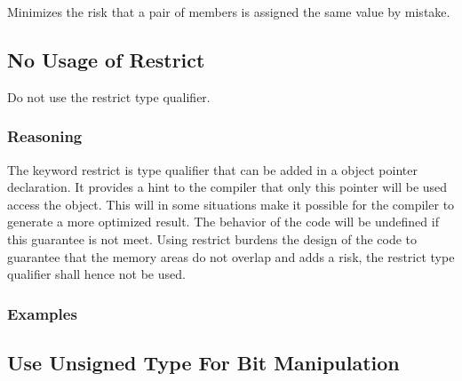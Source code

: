 \documentclass{article}
\begin{document}
Minimizes the risk that a pair of members is assigned the same value by mistake.
\begin{minipage}[t]{0.47\linewidth}

\end{minipage}
\hfill
\begin{minipage}[t]{0.47\linewidth}

\end{minipage}

\subsection{No Usage of Restrict}

Do not use the restrict type qualifier.

\subsubsection{Reasoning}

The keyword restrict is type qualifier that can be added in a object pointer declaration. It provides a hint to the compiler that only this pointer will be used access the object. This will in some situations make it possible for the compiler to generate a more optimized result. The behavior of the code will be undefined if this guarantee is not meet. Using restrict burdens the design of the code to guarantee that the memory areas do not overlap and adds a risk, the restrict type qualifier shall hence not be used.

\subsubsection{Examples}

\begin{minipage}[t]{0.47\linewidth}

\end{minipage}
\hfill
\begin{minipage}[t]{0.47\linewidth}

\end{minipage}

\subsection{Use Unsigned Type For Bit Manipulation}
\end{document}
